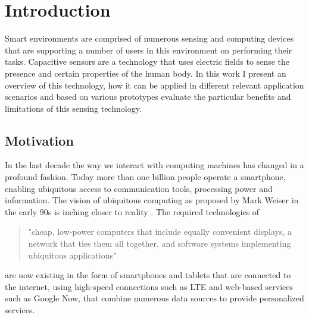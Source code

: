 \chapter{Introduction}
Smart environments are comprised of numerous sensing and computing devices that are supporting a number of users in this environment on performing their tasks. Capacitive sensors are a technology that uses electric fields to sense the presence and certain properties of the human body. In this work I present an overview of this technology, how it can be applied in different relevant application scenarios and  based on various prototypes evaluate the particular benefits and limitations of this sensing technology. 
\section{Motivation}
In the last decade the way we interact with computing machines has changed in a profound fashion. Today more than one billion people operate a smartphone, enabling ubiquitous access to communication tools, processing power and information. The vision of ubiquitous computing as proposed by Mark Weiser in the early 90s is inching closer to reality \cite{Weiser1991}. The required technologies of \begin{quote}
"cheap, low-power computers that include equally convenient displays, a network that ties them all together, and software systems implementing ubiquitous applications" 
\end{quote}
are now existing in the form of smartphones and tablets that are connected to the internet, using high-speed connections such as LTE and web-based services such as Google Now, that combine numerous data sources to provide personalized services.

